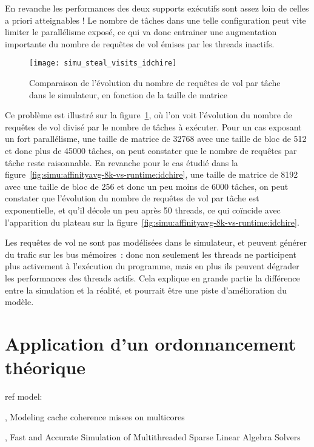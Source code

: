 En revanche les performances des deux supports exécutifs sont assez loin de celles a priori atteignables !
Le nombre de tâches dans une telle configuration peut vite limiter le parallélisme exposé, ce qui va donc entrainer une augmentation importante du nombre de requêtes de vol émises par les threads inactifs.

\begin{figure}[h!]
  \centering
  \texttt{[image: simu\_steal\_visits\_idchire]}
  \caption{Comparaison de l'évolution du nombre de requêtes de vol par tâche dans le simulateur, en fonction de la taille de matrice}\label{fig:simu:steals_per_task:idchire}
\end{figure}

Ce problème est illustré sur la figure~\ref{fig:simu:steals_per_task:idchire}, où l'on voit l'évolution du nombre de requêtes de vol divisé par le nombre de tâches à exécuter.
Pour un cas exposant un fort parallélisme, une taille de matrice de 32768 avec une taille de bloc de 512 et donc plus de 45000 tâches, on peut constater que le nombre de requêtes par tâche reste raisonnable.
En revanche pour le cas étudié dans la figure~\ref{fig:simu:affinityavg-8k-vs-runtime:idchire}, une taille de matrice de 8192 avec une taille de bloc de 256 et donc un peu moins de 6000 tâches, on peut constater que l'évolution du nombre de requêtes de vol par tâche est exponentielle, et qu'il décole un peu après 50 threads, ce qui coïncide avec l'apparition du plateau sur la figure~\ref{fig:simu:affinityavg-8k-vs-runtime:idchire}.

Les requêtes de vol ne sont pas modélisées dans le simulateur, et peuvent générer du trafic sur les bus mémoires~: donc non seulement les threads ne participent plus activement à l'exécution du programme, mais en plus ils peuvent dégrader les performances des threads actifs.
Cela explique en grande partie la différence entre la simulation et la réalité, et pourrait être une piste d'amélioration du modèle.


\section{Application d'un ordonnancement théorique}\label{sec:simulation:theorie}

ref model:

\cite{Pan2014}, Modeling cache coherence misses on multicores

\cite{Stanisic2016}, Fast and Accurate Simulation of Multithreaded Sparse Linear Algebra Solvers


